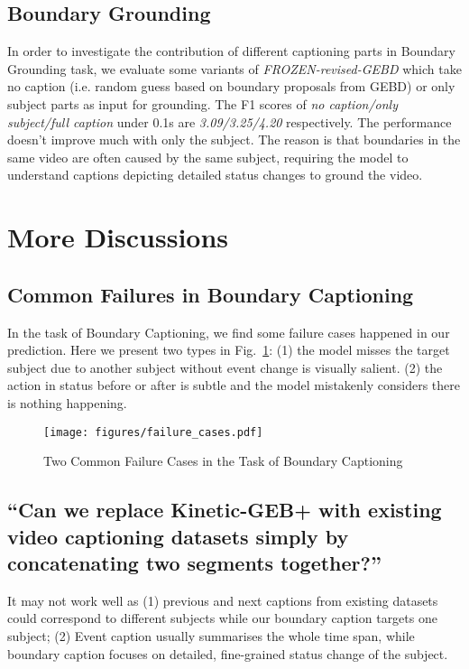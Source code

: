 \documentclass[runningheads]{llncs}
\begin{document}
\subsection{Boundary Grounding}
In order to investigate the contribution of different captioning parts in Boundary Grounding task, we evaluate some variants of \textit{FROZEN-revised-GEBD} which take no caption (i.e. random guess based on boundary proposals from GEBD) or only subject parts as input for grounding. The F1 scores of \textit{no caption/only subject/full caption} under 0.1s are \textit{3.09/3.25/4.20} respectively. The performance doesn't improve much with only the subject. The reason is that boundaries in the same video are often caused by the same subject, requiring the model to understand captions depicting detailed status changes to ground the video. \section{More Discussions}
\label{supp-sec:more_discusstion}

\subsection{Common Failures in Boundary Captioning}
In the task of Boundary Captioning, we find some failure cases happened in our prediction. Here we present two types in Fig.~\ref{fig:failure_case}: (1) the model misses the target subject due to another subject without event change is visually salient. (2) the action in status before or after is subtle and the model mistakenly considers there is nothing happening.

\begin{figure}[t]
\centering
\texttt{[image: figures/failure\_cases.pdf]}
\setlength{\abovecaptionskip}{0.9cm}
\caption{Two Common Failure Cases in the Task of Boundary Captioning}
\label{fig:failure_case}
\end{figure}

\subsection{``Can we replace Kinetic-GEB+ with existing video captioning datasets simply by concatenating two segments together?''}
It may not work well as (1) previous and next captions from existing datasets could correspond to different subjects while our boundary caption targets one subject; (2) Event caption usually summarises the whole time span, while boundary caption focuses on detailed, fine-grained status change of the subject. 


\end{document}
